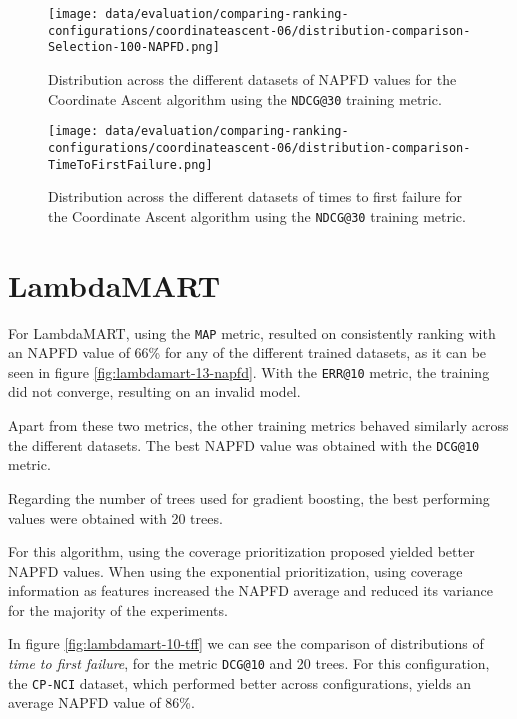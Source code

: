 \begin{figure}
    \centering
    \begin{minipage}{.45\textwidth}
        \centering
        \label{fig:coordinate-ascent-06-napfd}
        \texttt{[image: data/evaluation/comparing-ranking-configurations/coordinateascent-06/distribution-comparison-Selection-100-NAPFD.png]}
        \parbox{0.9\textwidth}{\caption{Distribution across the different datasets of NAPFD values for the Coordinate Ascent algorithm using the \texttt{NDCG@30} training metric.}}
    \end{minipage}%
    \begin{minipage}{.45\textwidth}
        \centering
        \label{fig:coordinate-ascent-06-tff}
        \texttt{[image: data/evaluation/comparing-ranking-configurations/coordinateascent-06/distribution-comparison-TimeToFirstFailure.png]}
        \parbox{0.9\textwidth}{\caption{Distribution across the different datasets of times to first failure for the Coordinate Ascent algorithm using the \texttt{NDCG@30} training metric.}}
    \end{minipage}%
\end{figure}

\section{LambdaMART}
For LambdaMART, using the \texttt{MAP} metric, resulted on consistently ranking with an NAPFD value of 66\% for any of the different 
trained datasets, as it can be seen in figure \ref{fig:lambdamart-13-napfd}. With the \texttt{ERR@10} metric, the training did not converge, resulting on an invalid model.

Apart from these two metrics, the other training metrics behaved similarly across the different datasets. The best NAPFD
value was obtained with the \texttt{DCG@10} metric.

Regarding the number of trees used for gradient boosting, the best performing values were obtained with 20 trees.

For this algorithm, using the coverage prioritization proposed yielded better NAPFD values. When using the exponential prioritization,
using coverage information as features increased the NAPFD average and reduced its variance for the majority of the experiments.

In figure \ref{fig:lambdamart-10-tff} we can see the comparison of distributions of \emph{time to first failure},
for the metric \texttt{DCG@10} and 20 trees. For this configuration, the \texttt{CP-NCI} dataset,
which performed better across configurations, yields an average NAPFD value of 86\%.


